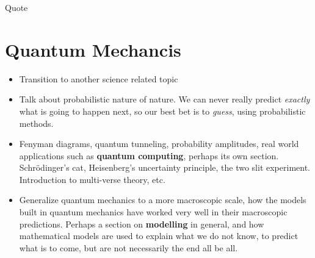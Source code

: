 \documentclass[../../fulltext/fulltext.tex]{subfiles}
\begin{document}
\begin{savequote}[45mm]
	Quote
\end{savequote}

\chapter{Quantum Mechancis}
\begin{itemize}
	\item Transition to another science related topic
	\item Talk about probabilistic nature of nature.  We can never really predict \emph{exactly} what is going to happen next, so our best bet is to \emph{guess}, using probabilistic methods.  
	\item Fenyman diagrams, quantum tunneling, probability amplitudes, real world applications such as \textbf{quantum computing}, perhaps its own section.  Schr{\"o}dinger's cat, Heisenberg's uncertainty principle, the two slit experiment.  Introduction to multi-verse theory, etc.
	\item Generalize quantum mechanics to a more macroscopic scale, how the models built in quantum mechanics have worked very well in their macroscopic predictions.  Perhaps a section on \textbf{modelling} in general, and how mathematical models are used to explain what we do not know, to predict what is to come, but are not necessarily the end all be all.  
\end{itemize}
\end{document}

